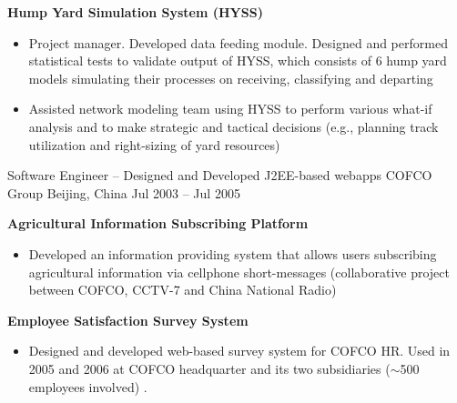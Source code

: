 \begin{cventries}
{\begin{cvitems}
{\begin{itemize}
\begin{itemize}
            \end{itemize}
        \end{itemize} 
	}
    \item {
        \textbf{Hump Yard Simulation System (HYSS)} 
        \begin{itemize}
        \item  Project manager. Developed data feeding module. Designed and performed statistical tests to validate output of HYSS,
              which consists of 6 hump yard models simulating their processes on receiving, classifying and departing
        \item  Assisted network modeling team using HYSS to perform various what-if analysis and to make strategic and tactical decisions (e.g., planning track utilization and right-sizing of yard resources)
        \end{itemize}     
    }
    \end{cvitems}
}


\cventry
{Software Engineer \tiny{-- Designed and Developed J2EE-based webapps}}                   %
{COFCO Group}                         %
{Beijing, China}                      %
{Jul 2003 -- Jul 2005}                %
{
    \begin{cvitems}                          
    \item {
        \textbf{Agricultural Information Subscribing Platform} 
        \begin{itemize}
            \item  Developed an information providing system that allows users subscribing agricultural information via cellphone short-messages
                   (collaborative project between COFCO, CCTV-7 and China National Radio)
        \end{itemize} 
	}          
    \item {
        \textbf{Employee Satisfaction Survey System }
        \begin{itemize}
            \item  Designed and developed web-based survey system for COFCO HR. 
                   Used in 2005 and 2006 at COFCO headquarter and its two subsidiaries ($\sim$500 employees involved) .
        \end{itemize} 
	}        
    \end{cvitems}  %
}
\end{cventries}
